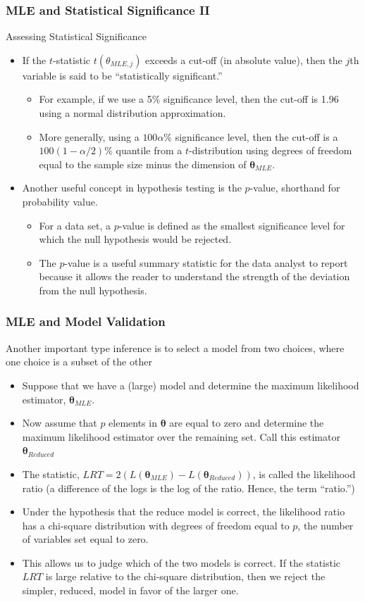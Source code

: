 \documentclass{beamer}
\begin{document}
\begin{frame}[shrink=2]
\frametitle{MLE and Statistical Significance II}
Assessing Statistical Significance
\begin{itemize}
\item If the $t$-statistic $t(\theta_{MLE,j})$ exceeds a cut-off (in absolute value), then the $j$th variable is said to be ``statistically significant.''
\begin{itemize}
\item For example, if we use a 5\% significance level, then the cut-off is 1.96 using a normal distribution approximation.
\item More generally, using a $100 \alpha \%$ significance level, then the cut-off is a  $100(1-\alpha/2)\%$ quantile from a $t$-distribution using degrees of freedom equal to the sample size minus the dimension of $\boldsymbol \theta_{MLE}$.
\end{itemize}
\item Another useful concept in hypothesis testing is the $p$-value, shorthand for probability value.
\begin{itemize}
\item For a data set, a $p$-value is defined as the smallest significance level for which the null hypothesis would be rejected.
\item The $p$-value is a useful summary statistic for the data analyst to report because it allows the reader to understand the strength of the deviation from the null hypothesis.
\end{itemize}
\end{itemize}
\end{frame}


\begin{frame}[shrink=2]
\frametitle{MLE and Model Validation}
Another important type inference is to select a model from two choices, where one choice is a subset of the other
\begin{itemize}
\item Suppose that we have a (large) model and determine the maximum likelihood estimator, $\boldsymbol \theta_{MLE}$.
\item Now assume that $p$ elements in $\boldsymbol \theta$ are equal to zero and determine the maximum likelihood estimator over the remaining set. Call this estimator  $\boldsymbol \theta_{Reduced}$
\item The statistic, $LRT= 2 \left( L(\boldsymbol \theta_{MLE}) - L(\boldsymbol \theta_{Reduced}) \right)$, is called the likelihood ratio (a difference of the logs is the log of the ratio. Hence, the term ``ratio.'')
\item Under the hypothesis that the reduce model is correct, the likelihood ratio has a chi-square distribution with degrees of freedom equal to $p$, the number of variables set equal to zero.
\item This allows us to judge which of the two models is correct. If the statistic $LRT$ is large relative to the chi-square distribution, then we reject the simpler, reduced, model in favor of the larger one.
\end{itemize}
\end{frame}
\end{document}

